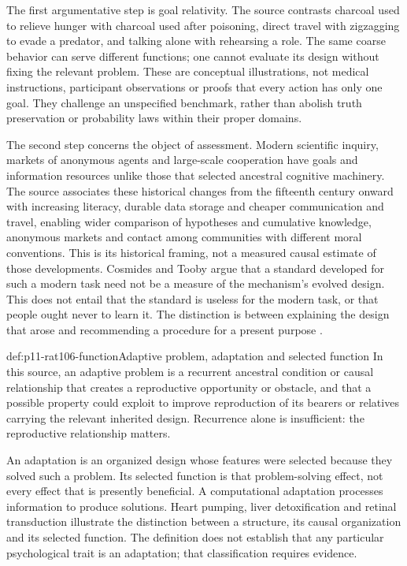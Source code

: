 The first argumentative step is goal relativity. The source contrasts
charcoal used to relieve hunger with charcoal used after poisoning,
direct travel with zigzagging to evade a predator, and talking alone
with rehearsing a role. The same coarse behavior can serve different
functions; one cannot evaluate its design without fixing the relevant
problem. These are conceptual illustrations, not medical instructions,
participant observations or proofs that every action has only one goal.
They challenge an unspecified benchmark, rather than abolish truth
preservation or probability laws within their proper domains.

The second step concerns the object of assessment. Modern scientific
inquiry, markets of anonymous agents and large-scale cooperation have
goals and information resources unlike those that selected ancestral
cognitive machinery. The source associates these historical changes
from the fifteenth century onward with increasing literacy, durable
data storage and cheaper communication and travel, enabling wider
comparison of hypotheses and cumulative knowledge, anonymous markets
and contact among communities with different moral conventions. This
is its historical framing, not a measured causal estimate of those
developments. Cosmides and Tooby argue that a standard developed
for such a modern task need not be a measure of the mechanism's evolved
design. This does not entail that the standard is useless for the modern
task, or that people ought never to learn it. The distinction is between
explaining the design that arose and recommending a procedure for a
present purpose \cite[p.~634]{CosmidesTooby2021Adaptationism}.

\begin{hbdefinition}{def:p11-rat106-function}{Adaptive problem, adaptation and selected function}
In this source, an adaptive problem is a recurrent ancestral condition or
causal relationship that creates a reproductive opportunity or obstacle,
and that a possible property could exploit to improve reproduction of
its bearers or relatives carrying the relevant inherited design.
Recurrence alone is insufficient: the reproductive relationship matters.

An adaptation is an organized design whose features were selected because
they solved such a problem. Its selected function is that problem-solving
effect, not every effect that is presently beneficial. A computational
adaptation processes information to produce solutions. Heart pumping,
liver detoxification and retinal transduction illustrate the distinction
between a structure, its causal organization and its selected function.
The definition does not establish that any particular psychological
trait is an adaptation; that classification requires evidence.
\end{hbdefinition}

